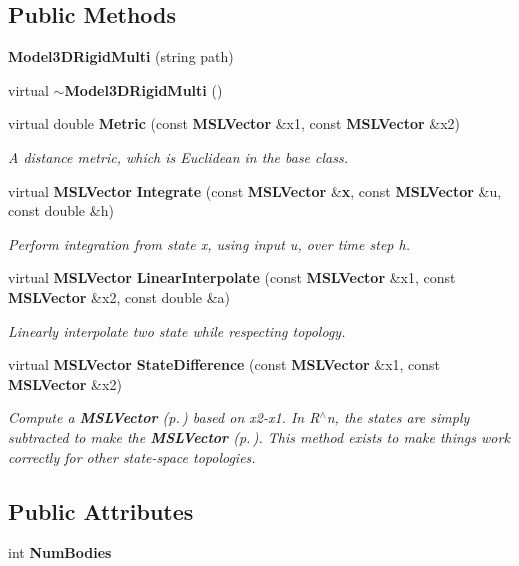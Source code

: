 \subsection*{Public Methods}
\begin{CompactItemize}
\item 
{\bf Model3DRigid\-Multi} (string path)
\item 
virtual {\bf $\sim$Model3DRigid\-Multi} ()
\item 
virtual double {\bf Metric} (const {\bf MSLVector} \&x1, const {\bf MSLVector} \&x2)
\begin{CompactList}\small\item\em A distance metric, which is Euclidean in the base class.\item\end{CompactList}\item 
virtual {\bf MSLVector} {\bf Integrate} (const {\bf MSLVector} \&{\bf x}, const {\bf MSLVector} \&u, const double \&h)
\begin{CompactList}\small\item\em Perform integration from state x, using input u, over time step h.\item\end{CompactList}\item 
virtual {\bf MSLVector} {\bf Linear\-Interpolate} (const {\bf MSLVector} \&x1, const {\bf MSLVector} \&x2, const double \&a)
\begin{CompactList}\small\item\em Linearly interpolate two state while respecting topology.\item\end{CompactList}\item 
virtual {\bf MSLVector} {\bf State\-Difference} (const {\bf MSLVector} \&x1, const {\bf MSLVector} \&x2)
\begin{CompactList}\small\item\em Compute a {\bf MSLVector} {\rm (p.\,\pageref{classMSLVector})} based on x2-x1. In R$^\wedge$n, the states are simply subtracted to make the {\bf MSLVector} {\rm (p.\,\pageref{classMSLVector})}. This method exists to make things work correctly for other state-space topologies.\item\end{CompactList}\end{CompactItemize}
\subsection*{Public Attributes}
\begin{CompactItemize}
\item 
int {\bf Num\-Bodies}
\end{CompactItemize}


